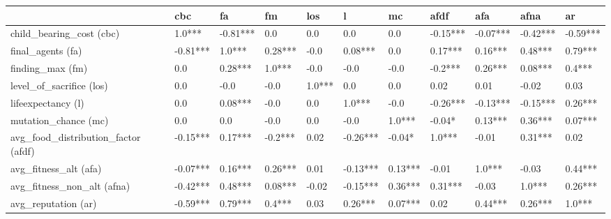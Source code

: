 \begin{tabular}{lllllllllll}
  \toprule
  {}                                     & cbc      & fa       & fm      & los    & l        & mc      & afdf     & afa      & afna     & ar       \\
  \midrule
  child\_bearing\_cost (cbc)             & 1.0***   & -0.81*** & 0.0     & 0.0    & 0.0      & 0.0     & -0.15*** & -0.07*** & -0.42*** & -0.59*** \\
  final\_agents (fa)                     & -0.81*** & 1.0***   & 0.28*** & -0.0   & 0.08***  & 0.0     & 0.17***  & 0.16***  & 0.48***  & 0.79***  \\
  finding\_max (fm)                      & 0.0      & 0.28***  & 1.0***  & -0.0   & -0.0     & -0.0    & -0.2***  & 0.26***  & 0.08***  & 0.4***   \\
  level\_of\_sacrifice (los)             & 0.0      & -0.0     & -0.0    & 1.0*** & 0.0      & 0.0     & 0.02     & 0.01     & -0.02    & 0.03     \\
  lifeexpectancy (l)                     & 0.0      & 0.08***  & -0.0    & 0.0    & 1.0***   & -0.0    & -0.26*** & -0.13*** & -0.15*** & 0.26***  \\
  mutation\_chance (mc)                  & 0.0      & 0.0      & -0.0    & 0.0    & -0.0     & 1.0***  & -0.04*   & 0.13***  & 0.36***  & 0.07***  \\
  avg\_food\_distribution\_factor (afdf) & -0.15*** & 0.17***  & -0.2*** & 0.02   & -0.26*** & -0.04*  & 1.0***   & -0.01    & 0.31***  & 0.02     \\
  avg\_fitness\_alt (afa)                & -0.07*** & 0.16***  & 0.26*** & 0.01   & -0.13*** & 0.13*** & -0.01    & 1.0***   & -0.03    & 0.44***  \\
  avg\_fitness\_non\_alt (afna)          & -0.42*** & 0.48***  & 0.08*** & -0.02  & -0.15*** & 0.36*** & 0.31***  & -0.03    & 1.0***   & 0.26***  \\
  avg\_reputation (ar)                   & -0.59*** & 0.79***  & 0.4***  & 0.03   & 0.26***  & 0.07*** & 0.02     & 0.44***  & 0.26***  & 1.0***   \\
  \bottomrule
\end{tabular}
